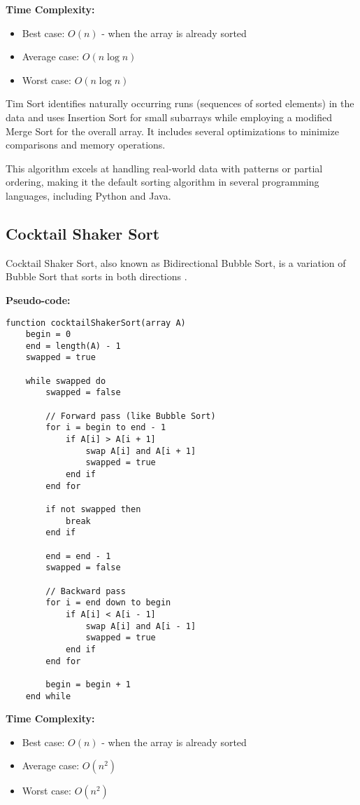 \documentclass[sigconf]{acmart}
\begin{document}
\textbf{Time Complexity:}
\begin{itemize}
    \item Best case: $O(n)$ - when the array is already sorted
    \item Average case: $O(n \log n)$
    \item Worst case: $O(n \log n)$
\end{itemize}

Tim Sort identifies naturally occurring runs (sequences of sorted elements) in the data and uses Insertion Sort for small subarrays while employing a modified Merge Sort for the overall array. It includes several optimizations to minimize comparisons and memory operations.

This algorithm excels at handling real-world data with patterns or partial ordering, making it the default sorting algorithm in several programming languages, including Python and Java.

\subsection{Cocktail Shaker Sort}
Cocktail Shaker Sort, also known as Bidirectional Bubble Sort, is a variation of Bubble Sort that sorts in both directions \cite{cocktailsort, knuth1998art}.

\textbf{Pseudo-code:}
\begin{verbatim}
function cocktailShakerSort(array A)
    begin = 0
    end = length(A) - 1
    swapped = true
    
    while swapped do
        swapped = false
        
        // Forward pass (like Bubble Sort)
        for i = begin to end - 1
            if A[i] > A[i + 1]
                swap A[i] and A[i + 1]
                swapped = true
            end if
        end for
        
        if not swapped then
            break
        end if
        
        end = end - 1
        swapped = false
        
        // Backward pass
        for i = end down to begin
            if A[i] < A[i - 1]
                swap A[i] and A[i - 1]
                swapped = true
            end if
        end for
        
        begin = begin + 1
    end while
\end{verbatim}

\textbf{Time Complexity:}
\begin{itemize}
    \item Best case: $O(n)$ - when the array is already sorted
    \item Average case: $O(n^2)$
    \item Worst case: $O(n^2)$
\end{itemize}
\end{document}
